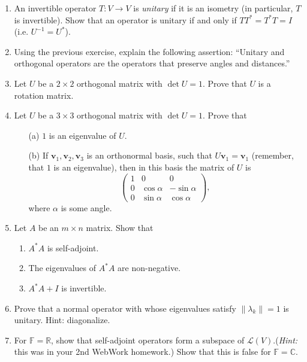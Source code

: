 \documentclass[a4paper,11pt]{article}
\theoremstyle{definition}
\begin{document}
\begin{enumerate}[(1)]
    
    \item 
    An invertible operator $T:V\to V$ is \textit{unitary} if it is an isometry (in particular, $T$ is invertible).
    Show that an operator is unitary if and only if $TT^*=T^*T=I$ (i.e. $U^{-1}=U^*$).
    
    \item 
    Using the previous exercise, explain the following assertion: ``Unitary and orthogonal operators are the operators that preserve angles and distances.''

    \item Let \( U \) be a \( 2 \times 2 \) orthogonal matrix with \( \det U = 1 \). Prove that \( U \) is a rotation matrix.

    \item
    Let \( U \) be a \( 3 \times 3 \) orthogonal matrix with \( \det U = 1 \). Prove that 

\begin{itemize}
    \item[(a)] \( 1 \) is an eigenvalue of \( U \).
    \item[(b)] If \( \mathbf{v}_1, \mathbf{v}_2, \mathbf{v}_3 \) is an orthonormal basis, such that \( U \mathbf{v}_1 = \mathbf{v}_1 \) (remember, that \( 1 \) is an eigenvalue), then in this basis the matrix of \( U \) is
    \[
    \begin{pmatrix}
    1 & 0 & 0 \\
    0 & \cos \alpha & -\sin \alpha \\
    0 & \sin \alpha & \cos \alpha
    \end{pmatrix},
    \]
    where \( \alpha \) is some angle.
\end{itemize}

    \item 
    Let $A$ be an $m\times n$ matrix.
    Show that
    \begin{enumerate}
        \item
        $A^*A$ is self-adjoint.
        \item
        The eigenvalues of $A^*A$ are non-negative.
        \item 
        $A^*A+I$ is invertible.
    \end{enumerate}

    \item 
    Prove that a normal operator with whose eigenvalues satisfy $\|\lambda_k\| = 1$ is unitary. Hint: diagonalize.

    \item 
    For $\mathbb F = \mathbb R$, show that self-adjoint operators form a subspace of $\mathcal L(V)$.(\textit{Hint:} this was in your 2nd WebWork homework.)
    Show that this is false for $\mathbb F=\mathbb C$.

\end{enumerate}
\end{document}
